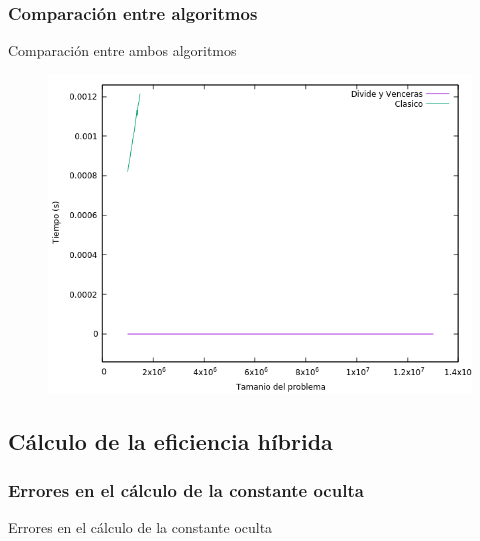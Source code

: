 \documentclass{beamer}
\begin{document}
\subsubsection{Comparación entre algoritmos}
\begin{frame}[fragile]{Comparación entre ambos algoritmos}
\begin{figure}[H]
\centering
\includegraphics[scale=0.5]{empirica_ambos.png}
\end{figure}
\end{frame}


\subsection{Cálculo de la eficiencia híbrida}

\subsubsection{Errores en el cálculo de la constante oculta}

\begin{frame}[fragile]{Errores en el cálculo de la constante oculta}
\begin{table}[H]
\centering
{}
\end{table}
\end{frame}
\end{document}
